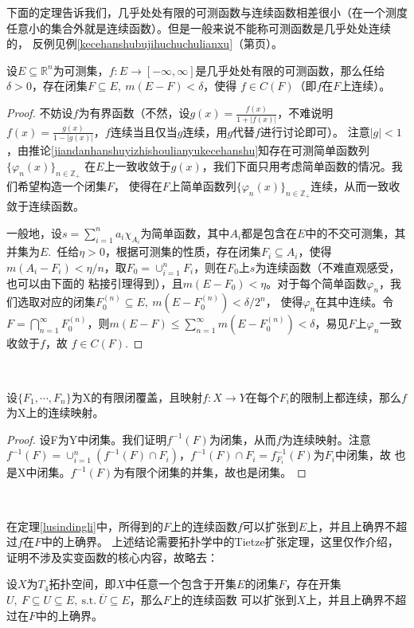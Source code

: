 \documentclass[color=green,thmcnt=section,lang=cn,12pt]{elegantbook}
\numberwithin{equation}{section}%
\numberwithin{figure}{section}%
\newcommand{\RR}{\mathbb{R}}
\renewcommand{\RN}{\RR^n}
\newcommand{\ZZ}{\mathbb{Z}}
\newcommand{\sothat}{\ \textrm{s.t.}\ }
\newcommand{\ci}[1]{\bigcap_{#1=1}^{\infty}} %
\newcommand{\cs}[1]{\sum_{#1=1}^{\infty}} %
\newcommand{\jd}[1]{#1=\sum_{i=1}^{n}a_i\chi_{A_i}} %
\newcommand{\p}[1]{（第\pageref{#1}页）}
\newcommand{\refp}[1]{\ref{#1}\p{#1}}
\begin{document}
下面的定理告诉我们，几乎处处有限的可测函数与连续函数相差很小（在一个测度任意小的集合外就是连续函数）。但是一般来说不能称可测函数是几乎处处连续的，
反例见例\refp{kecehanshubujihuchuchulianxu}。

\begin{theorem}[Lusin]\label{lusindingli}
    设$E\subseteq \RN$为可测集，$f:E\to [-\infty,\infty]$是几乎处处有限的可测函数，那么任给$\delta>0$，存在闭集$F\subseteq E,\ m(E-F)<\delta$，使得
    $f\in C(F)$（即$f$在$F$上连续）。
\end{theorem}
\begin{proof}
    不妨设$f$为有界函数（不然，设$g(x)=\frac{f(x)}{1+|f(x)|}$，不难说明$f(x)=\frac{g(x)}{1-|g(x)|}$，$f$连续当且仅当$g$连续，用$g$代替$f$进行讨论即可）。
    注意$|g|< 1$，由推论\ref{jiandanhanshuyizhishoulianyukecehanshu}知存在可测简单函数列$\{\varphi_n(x)\}_{n\in \ZZ_+}$
    在$E$上一致收敛于$g(x)$，我们下面只用考虑简单函数的情况。我们希望构造一个闭集$F$，
    使得在$F$上简单函数列$\{\varphi_n(x)\}_{n\in \ZZ_+}$连续，从而一致收敛于连续函数。


    一般地，设$\jd{s}$为简单函数，其中$A_i$都是包含在$E$中的不交可测集，其并集为$E$.\ 任给$\eta>0$，根据可测集的性质，存在闭集$F_i\subseteq A_i$，使得
    $m(A_i-F_i)<\eta/n$，取$F_0=\cup_{i=1}^{n}F_i$，则在$F_0$上$s$为连续函数（不难直观感受，也可以由下面的
    粘接引理得到），且$m(E-F_0)<\eta$。对于每个简单函数$\varphi_n$，我们选取对应的闭集$F_0^{(n)}\subseteq E,\ m(E-F_0^{(n)})<\delta/2^n$，
    使得$\varphi_n$在其中连续。令$F=\ci{n}F_0^{(n)}$，则$m(E-F)\leq \cs{n}m(E-F_0^{(n)})<\delta$，易见$F$上$\varphi_n $一致收敛于$f$，故
    $f\in C(F)$.
\end{proof}
\


\begin{lemma}[粘接引理]\label{zhanjieyinli}
    设$\{F_1,\cdots,F_n\}$为X的有限闭覆盖，且映射$f:X\to Y$在每个$F_i$的限制上都连续，那么$f$为X上的连续映射。
\end{lemma}
\begin{proof}
    设F为Y中闭集。我们证明$f^{-1}(F)$为闭集，从而$f$为连续映射。注意$f^{-1}(F)=\cup_{i=1}^{n}(f^{-1}(F)\cap F_i)$，$f^{-1}(F)\cap F_i=f^{-1}_{F_i}(F)$为$F_i$中闭集，故
    也是X中闭集。$f^{-1}(F)$为有限个闭集的并集，故也是闭集。
\end{proof}
\ 


在定理\ref{lusindingli}中，所得到的$F$上的连续函数$f$可以扩张到$E$上，并且上确界不超过$f$在$F$中的上确界。
上述结论需要拓扑学中的Tietze扩张定理，这里仅作介绍，证明不涉及实变函数的核心内容，故略去：
\begin{theorem}[Tietze扩张定理]\label{tietzekuozhangdingli}
    设$X$为$T_4$拓扑空间，即$X$中任意一个包含于开集$E$的闭集$F$，存在开集$U,\ F\subseteq U \subseteq E,\sothat \overline{U}\subseteq E$，那么$F$上的连续函数
    可以扩张到$X$上，并且上确界不超过在$F$中的上确界。
\end{theorem}
\end{document}
